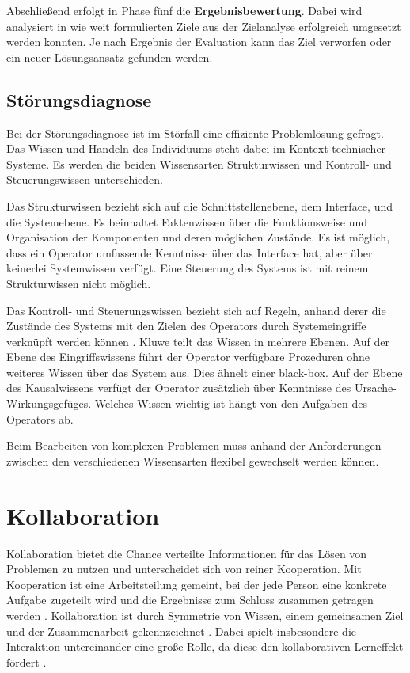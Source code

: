 Abschließend erfolgt in Phase fünf die \textbf{Ergebnisbewertung}. Dabei wird analysiert in wie weit formulierten Ziele aus der Zielanalyse erfolgreich umgesetzt werden konnten. Je nach Ergebnis der Evaluation kann das Ziel verworfen oder ein neuer Lösungsansatz gefunden werden.
\cite{Betsch2011}

\subsection{Störungsdiagnose}
\label{2-Störungsdiagnose}
Bei der Störungsdiagnose ist im Störfall eine effiziente Problemlösung gefragt. Das Wissen und Handeln des Individuums steht dabei im Kontext technischer Systeme. Es werden die beiden Wissensarten Strukturwissen und Kontroll- und Steuerungswissen unterschieden. \cite{Funke2015}

Das Strukturwissen bezieht sich auf die Schnittstellenebene, dem Interface, und die Systemebene. Es beinhaltet Faktenwissen über die Funktionsweise und Organisation der Komponenten und deren möglichen Zustände. Es ist möglich, dass ein Operator umfassende Kenntnisse über das Interface hat, aber über keinerlei Systemwissen verfügt. Eine Steuerung des Systems ist mit reinem Strukturwissen nicht möglich. \cite{Funke2015, Kluwe1997}

Das Kontroll- und Steuerungswissen bezieht sich auf Regeln, anhand derer die Zustände des Systems mit den Zielen des Operators durch Systemeingriffe verknüpft werden können \cite{Funke2015}. Kluwe \cite{Kluwe1997} teilt das Wissen in mehrere Ebenen. Auf der Ebene des Eingriffswissens führt der Operator verfügbare Prozeduren ohne weiteres Wissen über das System aus. Dies ähnelt einer black-box. Auf der Ebene des Kausalwissens verfügt der Operator zusätzlich über Kenntnisse des Ursache-Wirkungsgefüges. Welches Wissen wichtig ist hängt von den Aufgaben des Operators ab.

Beim Bearbeiten von komplexen Problemen muss anhand der Anforderungen zwischen den verschiedenen Wissensarten flexibel gewechselt werden können. \cite{Funke2015}

\section{Kollaboration}
Kollaboration bietet die Chance verteilte Informationen für das Lösen von Problemen zu nutzen und unterscheidet sich von reiner Kooperation. Mit Kooperation ist eine Arbeitsteilung gemeint, bei der jede Person eine konkrete Aufgabe zugeteilt wird und die Ergebnisse zum Schluss zusammen getragen werden \cite{Jermann2004}. Kollaboration ist durch Symmetrie von Wissen, einem gemeinsamen Ziel und der Zusammenarbeit gekennzeichnet \cite{Rummel1958}. Dabei spielt insbesondere die Interaktion untereinander eine große Rolle, da diese den kollaborativen Lerneffekt fördert \cite{Jermann2004}.

